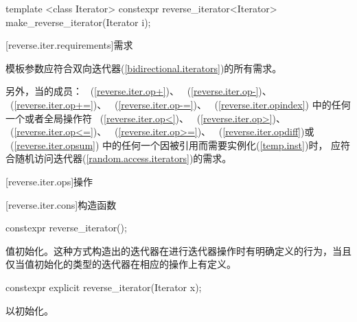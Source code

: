 \begin{codeblock}
{  template <class Iterator>
    constexpr reverse_iterator<Iterator> make_reverse_iterator(Iterator i);      
}
\end{codeblock}

[reverse.iter.requirements]{需求}

\pnum
模板参数应符合双向迭代器(\ref{bidirectional.iterators})的所有需求。

\pnum
另外，当的成员：
~(\ref{reverse.iter.op+})、
~(\ref{reverse.iter.op-})、
~(\ref{reverse.iter.op+=})、
~(\ref{reverse.iter.op-=})、
~(\ref{reverse.iter.opindex})
中的任何一个或者全局操作符
~(\ref{reverse.iter.op<})、
~(\ref{reverse.iter.op>})、\\
~(\ref{reverse.iter.op<=})、
~(\ref{reverse.iter.op>=})、
~(\ref{reverse.iter.opdiff})或
~(\ref{reverse.iter.opsum})
中的任何一个因被引用而需要实例化(\ref{temp.inst})时，
应符合随机访问迭代器(\ref{random.access.iterators})的需求。

[reverse.iter.ops]{操作}

[reverse.iter.cons]{构造函数}

%
\begin{itemdecl}
constexpr reverse_iterator();
\end{itemdecl}

\begin{itemdescr}
\pnum
\effects
值初始化。这种方式构造出的迭代器在进行迭代器操作时有明确定义的行为，当且仅当值初始化的类型的迭代器在相应的操作上有定义。
\end{itemdescr}

%

\begin{itemdecl}
constexpr explicit reverse_iterator(Iterator x);
\end{itemdecl}

\begin{itemdescr}
\pnum
\effects
以初始化。
\end{itemdescr}

%

